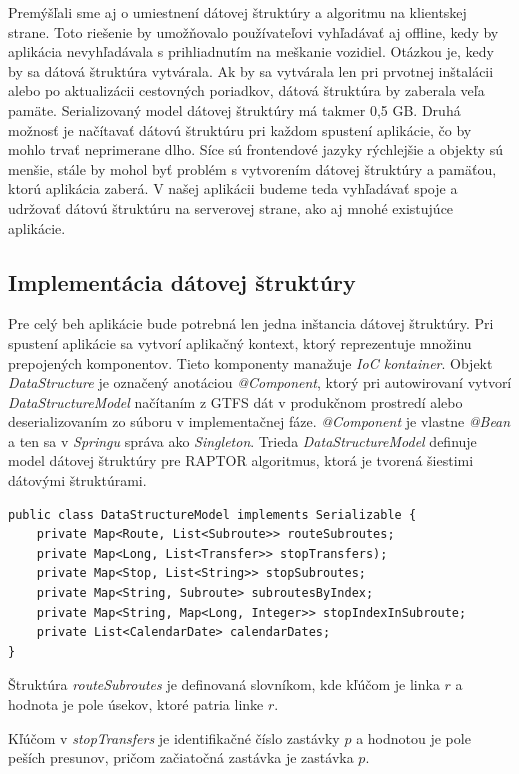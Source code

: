 Premýšľali sme aj o umiestnení dátovej štruktúry a algoritmu na klientskej strane. Toto riešenie by umožňovalo používateľovi vyhľadávať aj offline, kedy by aplikácia nevyhľadávala s prihliadnutím na meškanie vozidiel. Otázkou je, kedy by sa dátová štruktúra vytvárala. Ak by sa vytvárala len pri prvotnej inštalácii alebo po aktualizácii cestovných poriadkov, dátová štruktúra by zaberala veľa pamäte. Serializovaný model dátovej štruktúry má takmer 0,5 GB. Druhá možnosť je načítavať dátovú štruktúru pri každom spustení aplikácie, čo by mohlo trvať neprimerane dlho. Síce sú frontendové jazyky rýchlejšie a objekty sú menšie, stále by mohol byť problém s vytvorením dátovej štruktúry a pamäťou, ktorú aplikácia zaberá. V našej aplikácii budeme teda vyhľadávať spoje a udržovať dátovú štruktúru na serverovej strane, ako aj mnohé existujúce aplikácie.

\subsection{Implementácia dátovej štruktúry}
Pre celý beh aplikácie bude potrebná len jedna inštancia dátovej štruktúry. Pri spustení aplikácie sa vytvorí aplikačný kontext, ktorý reprezentuje množinu prepojených komponentov. Tieto komponenty manažuje \textit{IoC kontainer}. Objekt \textit{DataStructure} je označený anotáciou \textit{@Component}, ktorý pri autowirovaní vytvorí \textit{DataStructureModel} načítaním z GTFS dát v produkčnom prostredí alebo deserializovaním zo súboru v implementačnej fáze.\textit{ @Component }je vlastne \textit{@Bean} a ten sa v \textit{Springu} správa ako \textit{Singleton}. 
Trieda \textit{DataStructureModel} definuje model dátovej štruktúry pre RAPTOR algoritmus, ktorá je tvorená šiestimi dátovými štruktúrami. 
\begin{lstlisting}
public class DataStructureModel implements Serializable {
    private Map<Route, List<Subroute>> routeSubroutes;
    private Map<Long, List<Transfer>> stopTransfers);
    private Map<Stop, List<String>> stopSubroutes;
    private Map<String, Subroute> subroutesByIndex;
    private Map<String, Map<Long, Integer>> stopIndexInSubroute;
    private List<CalendarDate> calendarDates;
}
\end{lstlisting}
Štruktúra \textit{routeSubroutes} je definovaná slovníkom, kde kľúčom je linka $r$ a hodnota je pole úsekov, ktoré patria linke $r$. 

Kľúčom v \textit{stopTransfers} je identifikačné číslo zastávky $p$ a hodnotou je pole peších presunov, pričom začiatočná zastávka je zastávka $p$. 

